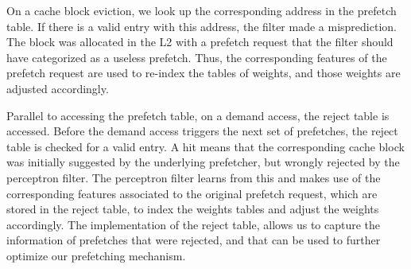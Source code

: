 On a cache block eviction, we look up the corresponding address in the
prefetch table. If there is a valid entry with this address, the
filter made a misprediction. The block was allocated in the L2 with a
prefetch request that the filter should have categorized as a useless
prefetch. Thus, the corresponding features of the prefetch request are
used to re-index the tables of weights, and those weights are adjusted
accordingly.


Parallel to accessing the prefetch table, on a demand access, the
reject table is accessed. Before the demand access triggers the next
set of prefetches, the reject table is checked for a valid entry. A
hit means that the corresponding cache block was initially suggested
by the {underlying} prefetcher, but wrongly rejected by the perceptron
filter. The perceptron filter learns from this and makes use of the
corresponding features associated to the original prefetch request,
which are stored in the reject table, to index the weights tables and
adjust the weights accordingly.
The implementation of the reject table, allows us to capture the 
information of prefetches that were rejected, and that can be used 
to further optimize our prefetching mechanism.
%

